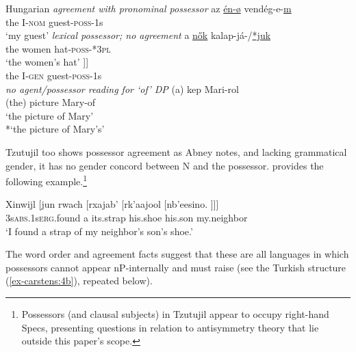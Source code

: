 \documentclass[output=paper
,modfonts
,nonflat]{langsci/langscibook}
\begin{document}
\begin{exe}
	\ex Hungarian \citep[90]{Szabolcsi1983} \label{ex-carstens:16}
	\xlist
		\ex \label{ex-carstens:16a}\textit{agreement with pronominal possessor} \newline
	\gll az   \underline{én-ø} vendég-e-\underline{m}\\
	the I-\textsc{nom} guest-\textsc{poss}{}-1s\\
	\glt `my guest'  	
		\ex \label{ex-carstens:16c}\textit{lexical possessor; no agreement}\newline
	\gll  a   \underline{n\H{o}k}       kalap-já-/\underline{*juk}\\
	the   women hat-\textsc{poss}{}-*\textsc{3pl}\\
	\glt `the women's hat' 
		\ex \label{ex-carstens:16d}
	\gll [\textsubscript{DP} az [\textsubscript{FP} én F\textsubscript{u}\textsubscript{$\phi$} [\textsubscript{nP} <az> \textit{n} vendég-e-m ]]]\\
{}	the  {}{} I-\textsc{gen} {} {} {} {} guest-\textsc{poss}-1s\\
		\ex \label{ex-carstens:16e}\textit{no agent/possessor reading for `of' DP} \newline
	\gll (a) kep       Mari-rol\\
(the) picture Mary-of\\
	\glt `the picture of Mary'\\ {*}`the picture of Mary's'
	\endxlist
\end{exe}
Tzutujil too shows possessor agreement as Abney notes, and lacking grammatical gender, it has no gender concord between N and the possessor. \citet[286]{Dayley1985} provides the following example.\footnote{Possessors (and clausal subjects) in Tzutujil appear to occupy right-hand Specs, presenting questions in relation to antisymmetry theory \citep{Kayne1994} that lie outside this paper’s scope.} 

\begin{exe}
	\ex 
	\gll Xinwijl [jun rwach [rxajab' [rk'aajool [nb'eesino. ]]]\\
	3s\textsc{abs}.1s\textsc{erg}.found     \hspace{0.1cm}a     its.strap    \hspace{0.1cm}his.shoe      \hspace{0.1cm}his.son    \hspace{0.1cm}my.neighbor\\
	\glt `I found a strap of my neighbor's son's shoe.'  	
\end{exe}
The word order and agreement facts suggest that these are all languages in which possessors cannot appear nP-internally and must raise (see the Turkish structure (\ref{ex-carstens:4b}), repeated below). 
\end{document}
